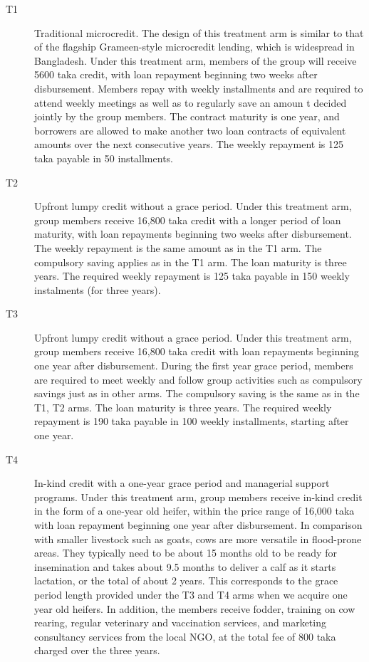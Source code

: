 	\begin{description}
	\vspace{1.0ex}\setlength{\itemsep}{1.0ex}\setlength{\baselineskip}{12pt}
	\item[T1]	Traditional microcredit. The design of this treatment arm is similar to that of the flagship Grameen-style microcredit lending, which is widespread in Bangladesh. Under this treatment arm, members of the group will receive 5600 taka credit, with loan repayment beginning two weeks after disbursement. Members repay with weekly installments and are required to attend weekly meetings as well as to regularly save an amoun	t decided jointly by the group members. The contract maturity is one year, and borrowers are allowed to make another two loan contracts of equivalent amounts over the next consecutive years. The weekly repayment is 125 taka payable in 50 installments.
	\item[T2]	Upfront lumpy credit without a grace period. Under this treatment arm, group members receive 16,800 taka credit with a longer period of loan maturity, with loan repayments beginning two weeks after disbursement. The weekly repayment is the same amount as in the T1 arm. The compulsory saving applies as in the T1 arm. The loan maturity is three years. The required weekly repayment is 125 taka payable in 150 weekly instalments (for three years). 
	\item[T3]	Upfront lumpy credit without a grace period. Under this treatment arm, group members receive 16,800 taka credit with loan repayments beginning one year after disbursement. During the first year grace period, members are required to meet weekly and follow group activities such as compulsory savings just as in other arms. The compulsory saving is the same as in the T1, T2 arms. The loan maturity is three years. The required weekly repayment is 190 taka payable in 100 weekly installments, starting after one year.
	\item[T4]	In-kind credit with a one-year grace period and managerial support programs. Under this treatment arm, group members receive in-kind credit in the form of a one-year old heifer, within the price range of 16,000 taka with loan repayment beginning one year after disbursement. In comparison with smaller livestock such as goats, cows are more versatile in flood-prone areas. They typically need to be about 15 months old to be ready for insemination and takes about 9.5 months to deliver a calf as it starts lactation, or the total of about 2 years. This corresponds to the grace period length provided under the T3 and T4 arms when we acquire one year old heifers. In addition, the members receive fodder, training on cow rearing, regular veterinary and vaccination services, and marketing consultancy services from the local NGO, at the total fee of 800 taka charged over the three years. 
	\end{description}

